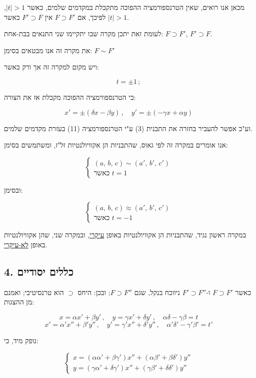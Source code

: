 מכאן אנו רואים, שאין הטרנספורמציה ההפוכה מתקבלת במקדמים שלמים, כאשר $|t| > 1$, לפיכך, אם $F \supset F'$ אין $F' \supset F$ כאשר $|t| > 1$.

\medskip
לעומת זאת יתכן מקרה שבו יתקיימו שני התנאים בבת-אחת: $F \supset F'$, $F' \supset F$.

\medskip
את מקרה זה אנו מבטאים בסימן: $F \sim F'$

\medskip
ויש מקום למקרה זה אך ורק כאשר:

\[ t = \pm 1 \, ; \tag{10} \]

כי הטרנספורמציה ההפוכה מקבלת אז את הצורה:

\[ x' = \pm(\delta x - \beta y) \, , \quad y' = \pm(-\gamma x + \alpha y) \tag{11} \]

וע"כ אפשר להעביר בחזרה את התבנית (3) ע"י הטרנספורמציה (11) בעזרת מקדמים שלמים.

\medskip
אנו אומרים במקרה זה לפי גאוס, שהתבניות הן אקוויולנטיות זל"ז, ומשתמשים בסימן:

\[
\begin{cases} (a,\,b,\,c) \sim (a',\,b',\,c') \\ \text{כאשר } t = 1 \end{cases}
\tag{12}
\]

ובסימן:

\[
\begin{cases} (a,\,b,\,c) \approx (a',\,b',\,c') \\ \text{כאשר } t = -1 \end{cases}
\tag{13}
\]

במקרה ראשון נגיד, שהתבניות הן אקוויולנטיות באופן \underline{עיקרי}, ובמקרה שני, שהן אקוויולנטיות באופן \underline{לא-עיקרי}.

\subsection*{4. כללים יסודיים}

כאשר $F \supset F'$ ו-$F' \supset F''$ ניווכח בנקל, שגם $F \supset F''$; ובכן: היחס $\supset$ הוא טרנסיטיבי; ואמנם מן ההצגות:

\[ x = \alpha x' + \beta y' \, , \quad y = \gamma x' + \delta y' \, , \quad \alpha\delta - \gamma\beta = t \tag{14} \]
\[ x' = \alpha' x'' + \beta' y'' \, , \quad y' = \gamma' x'' + \delta' y'' \, , \quad \alpha'\delta' - \gamma'\beta' = t' \tag{15} \]

נופק מיד, כי:

\[
\begin{cases}
x = (\alpha\alpha'+\beta\gamma')x'' + (\alpha\beta'+\beta\delta')y'' \\
y = (\gamma\alpha'+\delta\gamma')x'' + (\gamma\beta'+\delta\delta')y''
\end{cases}
\tag{16}
\]


